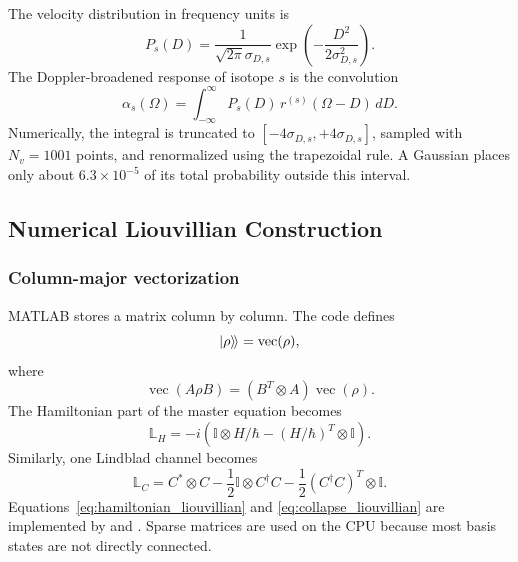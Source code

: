 The velocity distribution in frequency units is
\begin{equation}
P_s(D)
=
\frac{1}{\sqrt{2\pi}\sigma_{D,s}}
\exp\left(-\frac{D^2}{2\sigma_{D,s}^{2}}\right).
\label{eq:doppler_distribution}
\end{equation}
The Doppler-broadened response of isotope \(s\) is the convolution
\begin{equation}
\alpha_s(\Omega)
=
\int_{-\infty}^{\infty}
P_s(D)\,r^{(s)}(\Omega-D)\,dD.
\label{eq:doppler_convolution}
\end{equation}
Numerically, the integral is truncated to
\([-4\sigma_{D,s},+4\sigma_{D,s}]\), sampled with \(N_v=1001\) points, and
renormalized using the trapezoidal rule.  A Gaussian places only about
\(6.3\times10^{-5}\) of its total probability outside this interval.

\subsection{Numerical Liouvillian Construction}
\label{subsec:dm_numerics}

\subsubsection{Column-major vectorization}

MATLAB stores a matrix column by column.  The code defines
\begin{equation}
\left|\rho\right\rangle\!\rangle
=
\operatorname{vec}(\rho),
\end{equation}
where
\begin{equation}
\operatorname{vec}(A\rho B)
=
(B^{T}\otimes A)\operatorname{vec}(\rho).
\label{eq:vec_identity}
\end{equation}
The Hamiltonian part of the master equation becomes
\begin{equation}
\mathbb{L}_H
=
-i
\left(
\mathbb{I}\otimes H/\hbar
-
(H/\hbar)^T\otimes\mathbb{I}
\right).
\label{eq:hamiltonian_liouvillian}
\end{equation}
Similarly, one Lindblad channel becomes
\begin{equation}
\mathbb{L}_C
=
C^{*}\otimes C
-
\frac{1}{2}\mathbb{I}\otimes C^{\dagger}C
-
\frac{1}{2}(C^{\dagger}C)^T\otimes\mathbb{I}.
\label{eq:collapse_liouvillian}
\end{equation}
Equations~\eqref{eq:hamiltonian_liouvillian} and
\eqref{eq:collapse_liouvillian} are implemented by
 and
.  Sparse matrices are used on the CPU
because most basis states are not directly connected.

